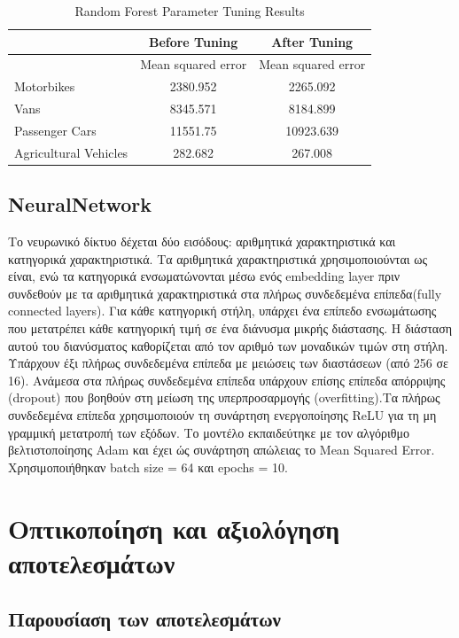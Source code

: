 \documentclass{llncs}
\begin{document}
\begin{table}[h!]
    \centering
    \begin{tabular}{lcc}
        \hline
        & \multicolumn{1}{c}{Before Tuning} & \multicolumn{1}{c}{After Tuning} \\
        \hline
        & Mean squared error & Mean squared error \\
        \hline
        Motorbikes & 2380.952 & 2265.092 \\
        Vans & 8345.571 &  8184.899 \\
        Passenger Cars & 11551.75  & 10923.639 \\
        Agricultural Vehicles & 282.682  & 267.008 \\
        \hline
    \end{tabular}
    \caption{Random Forest Parameter Tuning Results}
\end{table}

\subsection{NeuralNetwork}
Το νευρωνικό δίκτυο δέχεται δύο εισόδους: αριθμητικά χαρακτηριστικά και κατηγορικά χαρακτηριστικά.
Τα αριθμητικά χαρακτηριστικά χρησιμοποιούνται ως είναι, 
ενώ τα κατηγορικά ενσωματώνονται μέσω ενός embedding layer πριν συνδεθούν με τα αριθμητικά 
χαρακτηριστικά στα πλήρως συνδεδεμένα επίπεδα(fully connected layers).
Για κάθε κατηγορική στήλη, υπάρχει ένα επίπεδο ενσωμάτωσης που μετατρέπει κάθε κατηγορική 
τιμή σε ένα διάνυσμα μικρής διάστασης. Η διάσταση αυτού του διανύσματος 
καθορίζεται από τον αριθμό των μοναδικών τιμών στη στήλη. 
Υπάρχουν έξι πλήρως συνδεδεμένα επίπεδα με μειώσεις των διαστάσεων (από 256 σε 16). 
Ανάμεσα στα πλήρως συνδεδεμένα επίπεδα υπάρχουν επίσης επίπεδα απόρριψης (dropout) 
που βοηθούν στη μείωση της υπερπροσαρμογής (overfitting).Τα πλήρως συνδεδεμένα επίπεδα χρησιμοποιούν 
τη συνάρτηση ενεργοποίησης ReLU για τη μη γραμμική μετατροπή των εξόδων.
Το μοντέλο εκπαιδεύτηκε με τον αλγόριθμο βελτιστοποίησης Adam και έχει ώς συνάρτηση απώλειας το Mean Squared Error.
Xρησιμοποιήθηκαν batch size = 64 και epochs = 10. 


\section{Oπτικοποίηση και αξιολόγηση αποτελεσμάτων}

\subsection{Παρουσίαση των αποτελεσμάτων}
\end{document}
